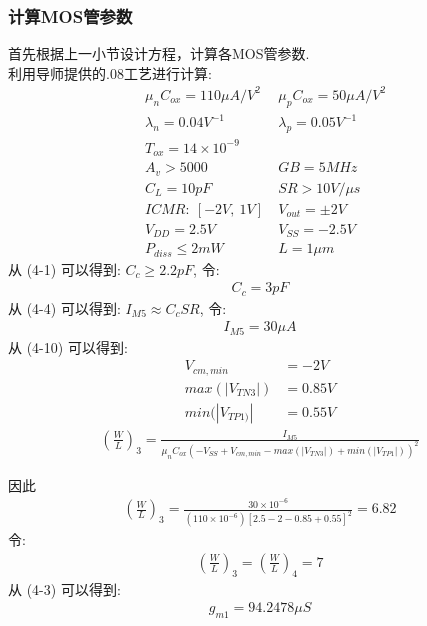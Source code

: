     \subsubsection{计算MOS管参数}
    首先根据上一小节设计方程，计算各MOS管参数. \\
    \indent 利用导师提供的.08工艺进行计算:
    \begin{align*}
        & \mu_n C_{ox}=110\mu A/V^2 \ & \mu_pC_{ox}=50\mu A/V^2 \\
        & \lambda_n=0.04V^{-1} \ & \lambda_p=0.05V^{-1} \\
        & T_{ox}=14\times 10^{-9} \\
        & A_v>5000 \ & GB=5MHz \\ 
        & C_L=10pF & SR>10V/\mu s \\
        & ICMR: \ [-2V,\ 1V] \ & V_{out}=\pm 2V \\
        & V_{DD}=2.5V \ & V_{SS} = -2.5V \\
        & P_{diss} \leq 2mW \ & L = 1\mu m 
    \end{align*}
    \indent 从 (4-1) 可以得到: $ C_c \geq 2.2pF $, 令: 
    \begin{align}
        C_c = 3pF 
    \end{align}
    \indent 从 (4-4) 可以得到: $ I_{M5} \approx C_cSR $, 令: 
    \begin{align} 
        I_{M5} = 30\mu A 
    \end{align}
    \indent 从 (4-10) 可以得到: 
    \begin{align}
        V_{cm,min} & =-2V\\
        max(|V_{TN3}|) & =0.85V\\
        min(|V_{TP1)}| & =0.55V
    \end{align}
    \begin{align}
        (\frac{W}{L})_3 = \frac{I_{M5}}{\mu_nC_{ox}(-V_{SS} + V_{cm,min} - max(|V_{TN3}|) + min(|V_{TP1}|))^2}
    \end{align}
    \par 因此
    \begin{align} 
        (\frac{W}{L})_3 = \frac{30\times 10^{-6}}{(110\times 10^{-6})[2.5-2-0.85+0.55]^2} = 6.82 
    \end{align}
    \indent 令: 
    \begin{align} 
        (\frac{W}{L})_3 = (\frac{W}{L})_4 = 7  
    \end{align}
    \indent 从 (4-3) 可以得到: 
    \begin{align} 
        g_{m1} = 94.2478\mu S 
    \end{align}
